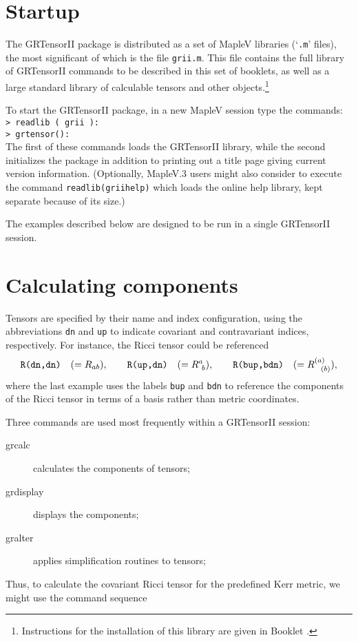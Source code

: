 \documentclass{article}
\begin{document}
\section{Startup}
The GRTensorII package is distributed as a set of MapleV libraries
(`\texttt{.m}' files), the most significant of which is the file
\texttt{grii.m}. This file contains the full library of GRTensorII
commands to be described in this set of booklets, as well as a large
standard library of calculable tensors and other
objects.\footnote{Instructions for the installation of this library
are given in Booklet \grSetupRef.}

To start the GRTensorII package, in a new MapleV session type the
commands:\\

\noindent\texttt{> readlib ( grii ):\\
> grtensor():}\\

\noindent The first of these commands loads the GRTensorII library,
while the second initializes the package in addition to printing out a
title page giving current version information. (Optionally, MapleV.3
users might also consider to execute the command \texttt{readlib(griihelp)}
which loads the online help library, kept separate because of its
size.)

The examples described below are designed to be run in a single
GRTensorII session.
\section{Calculating components}
Tensors are specified by their name and index configuration, using the
abbreviations {\tt dn} and {\tt up} to indicate covariant and
contravariant indices, respectively. For instance, the Ricci tensor
could be referenced
\[
  \text{\tt R(dn,dn)}\quad (= R_{ab}),\qquad
  \text{\tt R(up,dn)}\quad (= R^a_{\ b}), \qquad
  \text{\tt R(bup,bdn)}\quad (= R^{(a)}_{\ \ (b)}),
\]
where the last example uses the labels {\tt bup} and {\tt bdn} to
reference the components of the Ricci tensor in terms of a basis
rather than metric coordinates.

Three commands are used most frequently within a GRTensorII session:
\begin{description}
  \item[grcalc] calculates the components of tensors;
  \item[grdisplay] displays the components;
  \item[gralter] applies simplification routines to tensors;
\end{description}
Thus, to calculate the covariant Ricci tensor for the predefined Kerr metric,
we might use the command sequence\\
\end{document}
